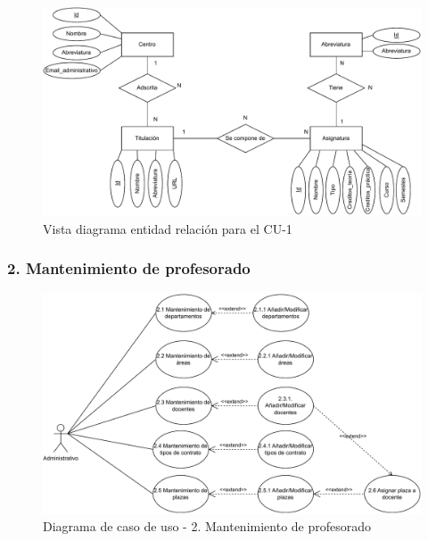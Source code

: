 \begin{figure}[!h]
	\centering
	\includegraphics[scale=0.75]{../img/Anexos/Casos uso/Vistas ER/Diagrama E-R CU 1.pdf}
	\caption{Vista diagrama entidad relación para el CU-1}
	\label{er_cu1}
\end{figure}
\FloatBarrier

\newpage
\subsubsection{2. Mantenimiento de profesorado}
\begin{figure}[!h]
	\centering
	\includegraphics[scale=0.75]{../img/Anexos/Casos uso/Diagrama casos de uso 3.pdf}
	\caption{Diagrama de caso de uso - 2. Mantenimiento de profesorado}
\end{figure}
\FloatBarrier

